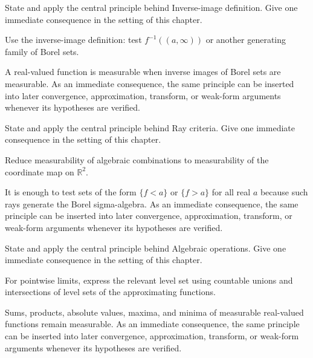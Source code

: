 \begin{exercise}\label{exr:iii02-01}
State and apply the central principle behind Inverse-image definition. Give one immediate consequence in the setting of this chapter.
\end{exercise}
\begin{hint}
Use the inverse-image definition: test \(f^{-1}((a,\infty))\) or another generating family of Borel sets.
\end{hint}
\begin{solution}
A real-valued function is measurable when inverse images of Borel sets are measurable. As an immediate consequence, the same principle can be inserted into later convergence, approximation, transform, or weak-form arguments whenever its hypotheses are verified.
\end{solution}

\begin{exercise}\label{exr:iii02-02}
State and apply the central principle behind Ray criteria. Give one immediate consequence in the setting of this chapter.
\end{exercise}
\begin{hint}
Reduce measurability of algebraic combinations to measurability of the coordinate map on \(\mathbb R^2\).
\end{hint}
\begin{solution}
It is enough to test sets of the form $\{f<a\}$ or $\{f>a\}$ for all real $a$ because such rays generate the Borel sigma-algebra. As an immediate consequence, the same principle can be inserted into later convergence, approximation, transform, or weak-form arguments whenever its hypotheses are verified.
\end{solution}

\begin{exercise}\label{exr:iii02-03}
State and apply the central principle behind Algebraic operations. Give one immediate consequence in the setting of this chapter.
\end{exercise}
\begin{hint}
For pointwise limits, express the relevant level set using countable unions and intersections of level sets of the approximating functions.
\end{hint}
\begin{solution}
Sums, products, absolute values, maxima, and minima of measurable real-valued functions remain measurable. As an immediate consequence, the same principle can be inserted into later convergence, approximation, transform, or weak-form arguments whenever its hypotheses are verified.
\end{solution}

